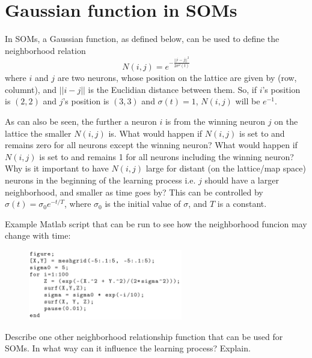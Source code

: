\section{Gaussian function in SOMs}
In SOMs, a Gaussian function, as defined below, can be used to define the neighborhood relation
\begin{equation}
N(i,j) = e^{-\frac{||i-j||^2}{2\sigma^2(t)}}
\end{equation}
where \(i\) and \(j\) are two neurons, whose position on the lattice are given by (row, columnt), and \(||i-j||\) is the Euclidian distance between them. So, if \(i\)'s position is \((2,2)\) and \(j\)'s position is \((3,3)\) and \(\sigma(t) = 1\), \(N(i,j)\) will be \(e^{-1}\).

As can also be seen, the further a neuron \(i\) is from the winning neuron \(j\) on the lattice the smaller \(N(i,j)\) is. What would happen if \(N(i,j)\) is set to and remains zero for all neurons except the winning neuron? What would happen if \(N(i,j)\) is set to and remains 1 for all neurons including the winning neuron? Why is it important to have \(N(i,j)\) large for distant (on the lattice/map space) neurons in the beginning of the learning process i.e. \(j\) should have a larger neighborhood, and smaller as time goes by? This can be controlled by \(\sigma(t)=\sigma_0e^{-t/T}\), where \(\sigma_0\) is the initial value of \(\sigma\), and \(T\) is a constant.

Example Matlab script that can be run to see how the neighborhood funcion may change with time:
\begin{figure}[H]
\begin{center}
\includegraphics[width=0.6\textwidth]{matlab_example.png}
\end{center}
\end{figure}

Describe one other neighborhood relationship function that can be used for SOMs. In what way can it influence the learning process? Explain.



